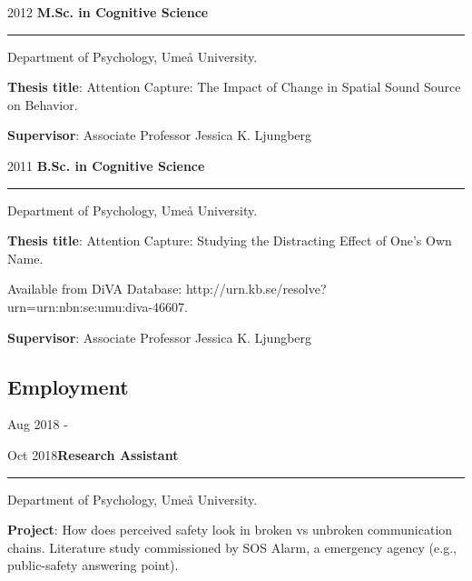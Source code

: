 \documentclass[]{article}
\begin{document}
2012 \hspace{1.5cm}\textbf{M.Sc. in Cognitive Science}

\hrule

\begin{changemargin}{2.3cm}{2.4cm}

Department of Psychology, Umeå University.

\textbf{Thesis title}: Attention Capture: The Impact of Change in Spatial Sound Source on Behavior. 
    
\textbf{Supervisor}: Associate Professor Jessica K. Ljungberg
    
\end{changemargin}

2011 \hspace{1.5cm}\textbf{B.Sc. in Cognitive Science} \hrule

\begin{changemargin}{2.3cm}{2.4cm}


Department of Psychology, Umeå University.

\textbf{Thesis title}:  Attention Capture: Studying the Distracting Effect of One’s Own Name.

Available from DiVA Database: http://urn.kb.se/resolve?urn=urn:nbn:se:umu:diva-46607.
    
\textbf{Supervisor}: Associate Professor Jessica K. Ljungberg

\end{changemargin}

\subsection{Employment}\label{employment}

Aug 2018 -

Oct 2018\hspace{0.75cm}\textbf{Research Assistant}

\hrule

\begin{changemargin}{2.3cm}{2.4cm}

Department of Psychology, Umeå University.

\textbf{Project}: How does perceived safety look in broken vs unbroken communication chains. Literature study commissioned by SOS Alarm, a emergency agency (e.g., public-safety answering point).

\end{changemargin}

\newpage 
\end{document}
